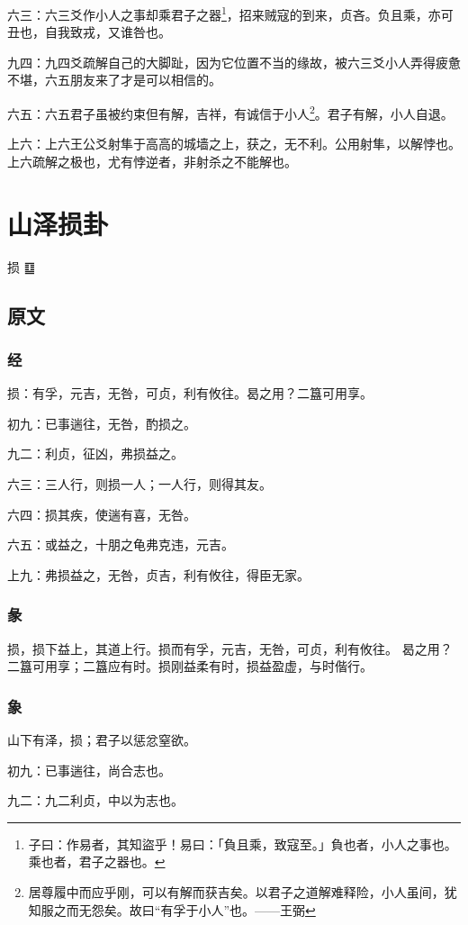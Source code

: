 \documentclass[12pt,oneside]{book}
\begin{document}
六三：六三爻作小人之事却乘君子之器\footnote{子曰：作易者，其知盜乎！易曰：「負且乘，致寇至。」負也者，小人之事也。乘也者，君子之器也。}，招来贼寇的到来，贞吝。负且乘，亦可丑也，自我致戎，又谁咎也。

九四：九四爻疏解自己的大脚趾，因为它位置不当的缘故，被六三爻小人弄得疲惫不堪，六五朋友来了才是可以相信的。

六五：六五君子虽被约束但有解，吉祥，有诚信于小人\footnote{居尊履中而应乎刚，可以有解而获吉矣。以君子之道解难释险，小人虽间，犹知服之而无怨矣。故曰“有孚于小人”也。——王弼}。君子有解，小人自退。

上六：上六王公爻射隼于高高的城墙之上，获之，无不利。公用射隼，以解悖也。上六疏解之极也，尤有悖逆者，非射杀之不能解也。


\chapter{山泽损卦}
损 {\Large ䷨}
\section{原文}

\subsection{经}
损：有孚，元吉，无咎，可贞，利有攸往。曷之用？二簋可用享。

初九：已事遄往，无咎，酌损之。

九二：利贞，征凶，弗损益之。

六三：三人行，则损一人；一人行，则得其友。

六四：损其疾，使遄有喜，无咎。

六五：或益之，十朋之龟弗克违，元吉。

上九：弗损益之，无咎，贞吉，利有攸往，得臣无家。

\subsection{彖}
损，损下益上，其道上行。损而有孚，元吉，无咎，可贞，利有攸往。 曷之用？ 二簋可用享；二簋应有时。损刚益柔有时，损益盈虚，与时偕行。

\subsection{象}
山下有泽，损；君子以惩忿窒欲。

初九：已事遄往，尚合志也。

九二：九二利贞，中以为志也。
\end{document}
